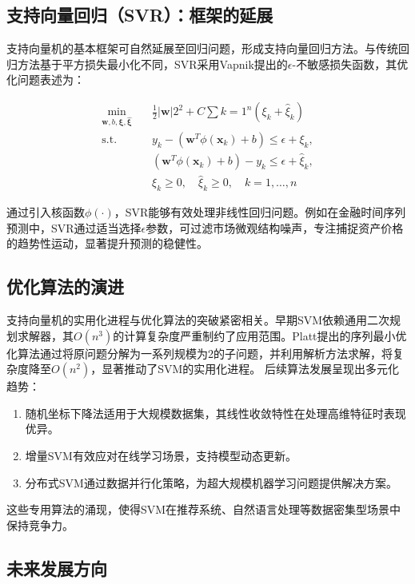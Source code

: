 \documentclass{article}
\newenvironment{solution_cn}{%
  \begin{proof}[解答]%
}{%
  \end{proof}%
}
\begin{document}
\begin{solution_cn}
\subsection{支持向量回归（SVR）：框架的延展}

支持向量机的基本框架可自然延展至回归问题，形成支持向量回归方法。与传统回归方法基于平方损失最小化不同，SVR采用Vapnik提出的$\epsilon$-不敏感损失函数，其优化问题表述为：

\begin{equation}
\begin{split}
\min_{\boldsymbol{w},b,\boldsymbol{\xi},\boldsymbol{\hat{\xi}}} \quad & \frac{1}{2} |\boldsymbol{w}|2^2 + C \sum{k=1}^{n} (\xi_k + \hat{\xi}_k) \\
\text{s.t.} \quad & y_k - (\boldsymbol{w}^T \phi(\boldsymbol{x}_k) + b) \leq \epsilon + \xi_k, \\
& (\boldsymbol{w}^T \phi(\boldsymbol{x}_k) + b) - y_k \leq \epsilon + \hat{\xi}_k, \\
& \xi_k \geq 0, \quad \hat{\xi}_k \geq 0, \quad k=1,\ldots,n
\end{split}
\end{equation}

通过引入核函数$\phi(\cdot)$，SVR能够有效处理非线性回归问题。例如在金融时间序列预测中，SVR通过适当选择$\epsilon$参数，可过滤市场微观结构噪声，专注捕捉资产价格的趋势性运动，显著提升预测的稳健性。

\subsection{优化算法的演进}

支持向量机的实用化进程与优化算法的突破紧密相关。早期SVM依赖通用二次规划求解器，其$O(n^3)$的计算复杂度严重制约了应用范围。Platt提出的序列最小优化算法通过将原问题分解为一系列规模为2的子问题，并利用解析方法求解，将复杂度降至$O(n^2)$，显著推动了SVM的实用化进程。
后续算法发展呈现出多元化趋势：
\begin{enumerate}
\item 随机坐标下降法适用于大规模数据集，其线性收敛特性在处理高维特征时表现优异。

\item 增量SVM有效应对在线学习场景，支持模型动态更新。

\item 分布式SVM通过数据并行化策略，为超大规模机器学习问题提供解决方案。
\end{enumerate}
这些专用算法的涌现，使得SVM在推荐系统、自然语言处理等数据密集型场景中保持竞争力。
\subsection{未来发展方向}


\end{solution_cn}
\end{document}
